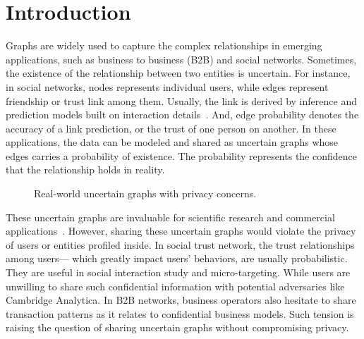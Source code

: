 \section{Introduction}

\label{sec:Intro}

Graphs are widely used to capture the complex relationships in emerging applications, such as business to business (B2B) and social networks. 
Sometimes, the existence of the relationship between two entities is uncertain. For instance, in social networks, nodes represents individual users, while edges represent friendship or trust link among them.  Usually, the link is derived by inference and prediction models built on interaction details~\cite{Lin_B2B,Adar_Managing_2007,Kempe_Maximizing_2003}. And, edge probability denotes the accuracy of a link prediction, or the trust of one person on another. 
In these applications, the data can be modeled and shared as uncertain graphs whose edges carries a probability of existence. The probability represents the confidence that the relationship holds in reality. 

\begin{figure}[!htb]
  \vspace{-7pt}
    \vspace{-7pt}
    \caption{Real-world uncertain graphs with privacy concerns.}
    \label{fig:motivation}
    \vspace{-7pt}
\end{figure} 

These uncertain graphs are invaluable for scientific research and commercial applications~\cite{Kempe_Maximizing_2003,Cho_Friendship_2011}. However, sharing these uncertain graphs would violate the privacy of users or entities profiled inside. In social trust network, the trust relationships among users--- which greatly impact users' behaviors, are usually probabilistic.  They are useful in social interaction study and micro-targeting. While users are unwilling to share such confidential information with potential adversaries like Cambridge Analytica. In B2B networks, business operators also hesitate to share transaction patterns as it relates to  confidential business models. Such tension is raising the question of sharing uncertain graphs without compromising privacy. 


